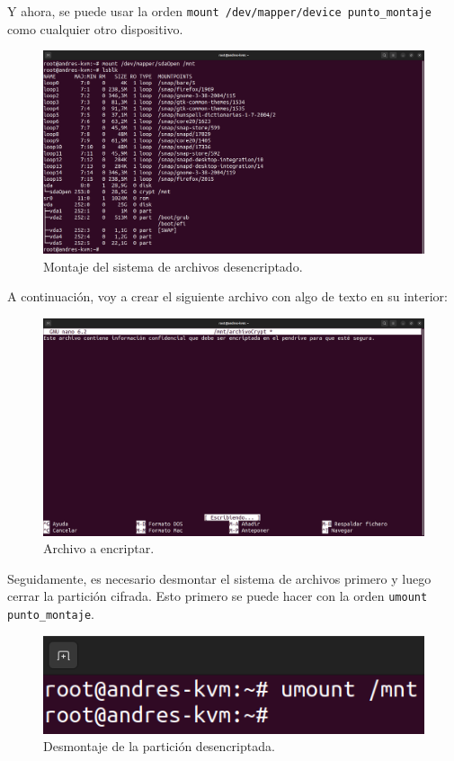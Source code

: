 \documentclass{article}
\begin{document}
Y ahora, se puede usar la orden \verb|mount /dev/mapper/device punto_montaje| como cualquier otro dispositivo.

\begin{figure}[H]
    \includegraphics[width=\textwidth]{imagenes/Captura desde 2022-10-30 10-58-23.png}
    \caption{Montaje del sistema de archivos desencriptado.}
\end{figure}

\newpage

A continuación, voy a crear el siguiente archivo con algo de texto en su interior:

\begin{figure}[H]
    \includegraphics[width=\textwidth]{imagenes/Captura desde 2022-10-30 10-59-27.png}
    \caption{Archivo a encriptar.}
\end{figure}

\bigskip

Seguidamente, es necesario desmontar el sistema de archivos primero y luego cerrar la partición cifrada. Esto primero se puede hacer con la orden \verb|umount punto_montaje|.

\begin{figure}[H]
    \includegraphics[width=\textwidth]{imagenes/Captura desde 2022-10-30 11-00-34.png}
    \caption{Desmontaje de la partición desencriptada.}
\end{figure}
\end{document}
